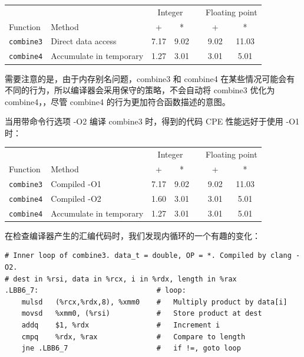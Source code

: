 \begin{table}[!ht]
    \centering
    \begin{tabular}{llccccc}
        \toprule
        & & \multicolumn{2}{c}{Integer} & & \multicolumn{2}{c}{Floating point} \\
        \cmidrule{3-4} \cmidrule{6-7}
        Function & Method & + & * & & + & * \\
        \midrule
        \texttt{combine3} & Direct data access & 7.17 & 9.02 & & 9.02 & 11.03 \\
        \texttt{combine4} & Accumulate in temporary & 1.27 & 3.01 & & 3.01 & 5.01 \\
        \bottomrule
    \end{tabular}
\end{table}

需要注意的是，由于内存别名问题，combine3 和 combine4 在某些情况可能会有不同的行为，所以编译器会采用保守的策略，不会自动将 combine3 优化为 combine4，，尽管 combine4 的行为更加符合函数描述的意图。

当用带命令行选项 -O2 编译 combine3 时，得到的代码 CPE 性能远好于使用 -O1 时：

\begin{table}[!ht]
    \centering
    \begin{tabular}{llccccc}
        \toprule
        & & \multicolumn{2}{c}{Integer} & & \multicolumn{2}{c}{Floating point} \\
        \cmidrule{3-4} \cmidrule{6-7}
        Function & Method & + & * & & + & * \\
        \midrule
        \texttt{combine3} & Compiled -O1 & 7.17 & 9.02 & & 9.02 & 11.03 \\
        \texttt{combine4} & Compiled -O2 & 1.60 & 3.01 & & 3.01 & 5.01 \\
        \texttt{combine4} & Accumulate in temporary & 1.27 & 3.01 & & 3.01 & 5.01 \\
        \bottomrule
    \end{tabular}
\end{table}

在检查编译器产生的汇编代码时，我们发现内循环的一个有趣的变化：

\begin{verbatim}
# Inner loop of combine3. data_t = double, OP = *. Compiled by clang -O2.
# dest in %rsi, data in %rcx, i in %rdx, length in %rax
.LBB6_7:                            # loop:
    mulsd   (%rcx,%rdx,8), %xmm0    #   Multiply product by data[i]
    movsd   %xmm0, (%rsi)           #   Store product at dest
    addq    $1, %rdx                #   Increment i
    cmpq    %rdx, %rax              #   Compare to length
    jne .LBB6_7                     #   if !=, goto loop
\end{verbatim}

